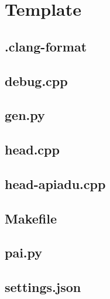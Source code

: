 \section{Template}

\subsection{.clang-format}


\subsection{debug.cpp}


\subsection{gen.py}


\subsection{head.cpp}


\subsection{head-apiadu.cpp}


\subsection{Makefile}


\subsection{pai.py}


\subsection{settings.json}


